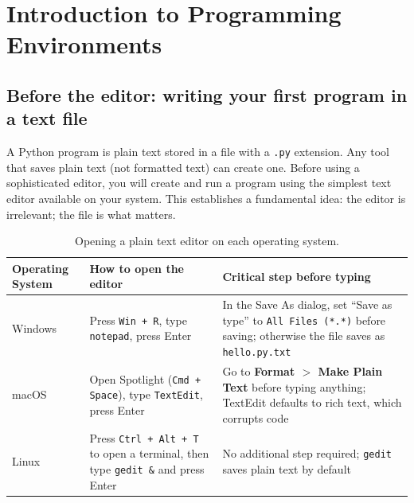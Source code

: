\chapter{Introduction to Programming Environments}

\section{Before the editor: writing your first program in a text file}
\label{sec:plaintext-first}

A Python program is plain text stored in a file with a \texttt{.py}
extension. Any tool that saves plain text (not formatted text) can
create one. Before using a sophisticated editor, you will create and
run a program using the simplest text editor available on your system.
This establishes a fundamental idea: the editor is irrelevant; the
file is what matters.

\begin{table}[htbp]
\centering
\caption{Opening a plain text editor on each operating system.}
\label{tab:text-editors}
\begin{tabular}{p{2.8cm} p{5.5cm} p{6.5cm}}
\toprule
\textbf{Operating System} & \textbf{How to open the editor} & \textbf{Critical step before typing} \\
\midrule
Windows &
Press \texttt{Win + R}, type \texttt{notepad}, press Enter &
In the Save As dialog, set ``Save as type'' to \texttt{All Files (*.*)} before saving; otherwise the file saves as \texttt{hello.py.txt} \\
\midrule
macOS &
Open Spotlight (\texttt{Cmd + Space}), type \texttt{TextEdit}, press Enter &
Go to \textbf{Format $>$ Make Plain Text} before typing anything; TextEdit defaults to rich text, which corrupts code \\
\midrule
Linux &
Press \texttt{Ctrl + Alt + T} to open a terminal, then type \texttt{gedit \&} and press Enter &
No additional step required; \texttt{gedit} saves plain text by default \\
\bottomrule
\end{tabular}
\end{table}

